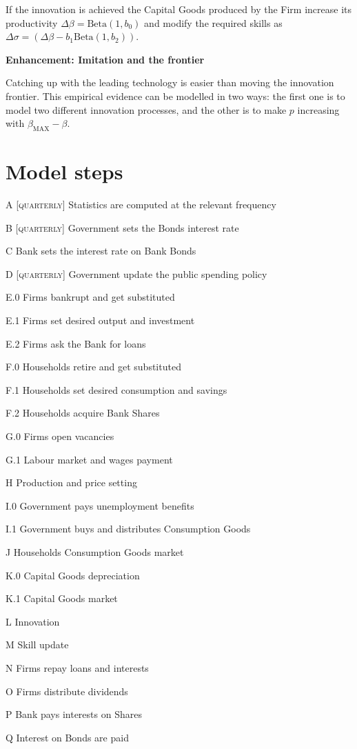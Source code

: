 \documentclass[a4paper, headings=standardclasses]{scrartcl}
\numberwithin{equation}{subsection}
\newenvironment{enh}[1][]{\begin{framed}\noindent\textbf{Enhancement: #1}\par}{\end{framed}}
\begin{document}
If the innovation is achieved the Capital Goods produced by the Firm increase its productivity $\Delta \beta = \text{Beta}(1, b_0)$ and modify the required skills as $\Delta \sigma = (\Delta \beta - b_1 \text{Beta}(1, b_2))$.

\begin{enh}[Imitation and the frontier]
    Catching up with the leading technology is easier than moving the innovation frontier. This empirical evidence can be modelled in two ways: the first one is to model two different innovation processes, and the other is to make $p$ increasing with $\beta_\text{MAX} - \beta$.
\end{enh}

\section{Model steps}
\begin{steps}
    \item[A] [\textsc{quarterly}] Statistics are computed at the relevant frequency
    \item[B] [\textsc{quarterly}] Government sets the Bonds interest rate
    \item[C] Bank sets the interest rate on Bank Bonds
    \item[D] [\textsc{quarterly}] Government update the public spending policy
    \item[E.0] Firms bankrupt and get substituted
    \item[E.1] Firms set desired output and investment
    \item[E.2] Firms ask the Bank for loans
    \item[F.0] Households retire and get substituted
    \item[F.1] Households set desired consumption and savings
    \item[F.2] Households acquire Bank Shares
    \item[G.0] Firms open vacancies
    \item[G.1] Labour market and wages payment
    \item[H] Production and price setting
    \item[I.0] Government pays unemployment benefits
    \item[I.1] Government buys and distributes Consumption Goods
    \item[J] Households Consumption Goods market
    \item[K.0] Capital Goods depreciation
    \item[K.1] Capital Goods market
    \item[L] Innovation
    \item[M] Skill update
    \item[N] Firms repay loans and interests
    \item[O] Firms distribute dividends
    \item[P] Bank pays interests on Shares
    \item[Q] Interest on Bonds are paid
\end{steps}
\end{document}
